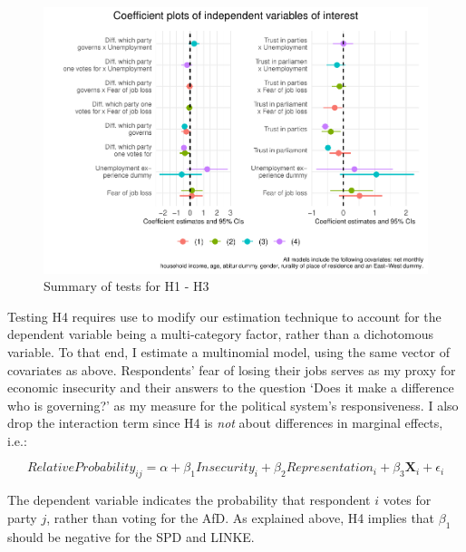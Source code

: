 \documentclass[
]{article}
\begin{document}
\begin{figure}
\centering
\includegraphics{AVCD_Final-Assignment-Edenhofer_files/figure-latex/regression-results1-plot-1.pdf}
\caption{Summary of tests for H1 - H3}
\end{figure}

Testing H4 requires use to modify our estimation technique to account
for the dependent variable being a multi-category factor, rather than a
dichotomous variable. To that end, I estimate a multinomial model, using
the same vector of covariates as above. Respondents' fear of losing
their jobs serves as my proxy for economic insecurity and their answers
to the question `Does it make a difference who is governing?' as my
measure for the political system's responsiveness. I also drop the
interaction term since H4 is \emph{not} about differences in marginal
effects, i.e.:

\[
RelativeProbability_{ij} = \alpha + \beta_{1}Insecurity_{i} +  \beta_{2}Representation_{i} + \beta_{3}\textbf{X}_{i} + \epsilon_{i}
\]

The dependent variable indicates the probability that respondent \(i\)
votes for party \(j\), rather than voting for the AfD. As explained
above, H4 implies that \(\beta_{1}\) should be negative for the SPD and
LINKE.
\end{document}
